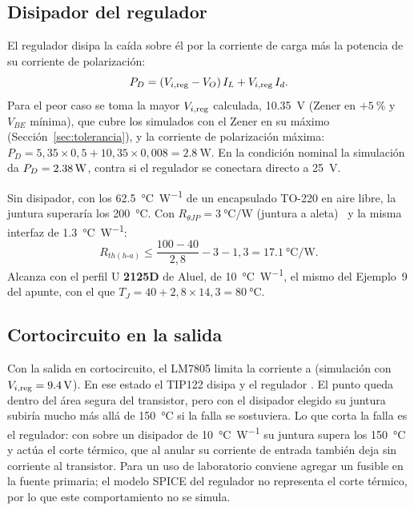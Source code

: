 \subsection{Disipador del regulador}
El regulador disipa la caída sobre él por la corriente de carga más la potencia de su corriente de polarización:
\begin{equation}
    P_{D} = (V_{i,\mathrm{reg}} - V_O)\, I_L + V_{i,\mathrm{reg}}\, I_d.
\end{equation}
Para el peor caso se toma la mayor $V_{i,\mathrm{reg}}$ calculada, \SI{10,35}{\volt} (Zener en $+\SI{5}{\percent}$ y $V_{BE}$ mínima), que cubre los  simulados con el Zener en su máximo (Sección~\ref{sec:tolerancia}), y la corriente de polarización máxima: $P_D = 5{,}35 \times 0{,}5 + 10{,}35 \times 0{,}008 = \SI{2,8}{\watt}$. En la condición nominal la simulación da $P_D = \valu{2}{\simPregVeinticinco}{\watt}$, contra  si el regulador se conectara directo a \SI{25}{\volt}.

Sin disipador, con los \SI{62,5}{\celsius\per\watt} de un encapsulado TO-220 en aire libre, la juntura superaría los \SI{200}{\celsius}. Con $R_{\theta JP} = \SI{3}{\celsius\per\watt}$ (juntura a aleta)~\cite{ua78} y la misma interfaz de \SI{1,3}{\celsius\per\watt}:
\begin{equation}
    R_{th(h\text{-}a)} \leq \frac{100 - 40}{2{,}8} - 3 - 1{,}3 = \SI{17,1}{\celsius\per\watt}.
\end{equation}
Alcanza con el perfil U \textbf{2125D} de Aluel, de \SI{10}{\celsius\per\watt}, el mismo del Ejemplo~9 del apunte, con el que $T_J = 40 + 2{,}8 \times 14{,}3 = \SI{80}{\celsius}$.

\subsection{Cortocircuito en la salida}
\label{sec:corto}
Con la salida en cortocircuito, el LM7805 limita la corriente a  (simulación con $\Vireg = \valu{1}{\simViregCorto}{\volt}$). En ese estado el TIP122 disipa  y el regulador . El punto queda dentro del área segura del transistor, pero con el disipador elegido su juntura subiría mucho más allá de \SI{150}{\celsius} si la falla se sostuviera. Lo que corta la falla es el regulador: con  sobre un disipador de \SI{10}{\celsius\per\watt} su juntura supera los \SI{150}{\celsius} y actúa el corte térmico, que al anular su corriente de entrada también deja sin corriente al transistor. Para un uso de laboratorio conviene agregar un fusible en la fuente primaria; el modelo SPICE del regulador no representa el corte térmico, por lo que este comportamiento no se simula.
